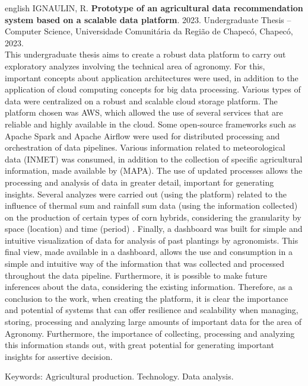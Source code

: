 \begin{resumo}[Abstract]
 \begin{otherlanguage*}{english}
\noindent IGNAULIN, R.  \textbf{Prototype of an agricultural data recommendation system based on a scalable data platform}. 2023. Undergraduate Thesis – Computer Science, Universidade Comunitária da Região de Chapecó, Chapecó, 2023.\\

\noindent This undergraduate thesis aims to create a robust data platform to carry out exploratory analyzes involving the technical area of agronomy. For this, important concepts about application architectures were used, in addition to the application of cloud computing concepts for big data processing. Various types of data were centralized on a robust and scalable cloud storage platform. The platform chosen was AWS, which allowed the use of several services that are reliable and highly available in the cloud. Some open-source frameworks such as Apache Spark and Apache Airflow were used for distributed processing and orchestration of data pipelines. Various information related to meteorological data (INMET) was consumed, in addition to the collection of specific agricultural information, made available by (MAPA). The use of updated processes allows the processing and analysis of data in greater detail, important for generating insights. Several analyzes were carried out (using the platform) related to the influence of thermal sum and rainfall sum data (using the information collected) on the production of certain types of corn hybrids, considering the granularity by space (location) and time (period) . Finally, a dashboard was built for simple and intuitive visualization of data for analysis of past plantings by agronomists. This final view, made available in a dashboard, allows the use and consumption in a simple and intuitive way of the information that was collected and processed throughout the data pipeline. Furthermore, it is possible to make future inferences about the data, considering the existing information. Therefore, as a conclusion to the work, when creating the platform, it is clear the importance and potential of systems that can offer resilience and scalability when managing, storing, processing and analyzing large amounts of important data for the area of Agronomy. Furthermore, the importance of collecting, processing and analyzing this information stands out, with great potential for generating important insights for assertive decision.


\noindent Keywords: Agricultural production. Technology. Data analysis.
\end{otherlanguage*}


\end{resumo}